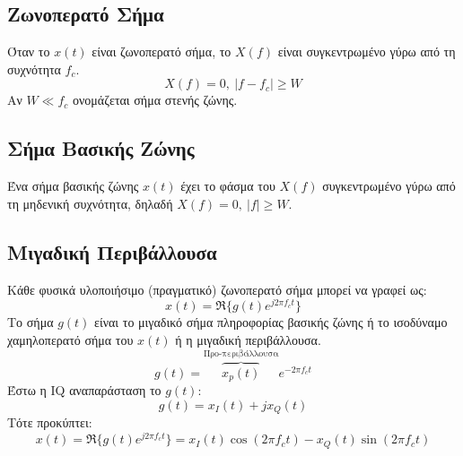 \documentclass[a4paper,12pt]{article}
\begin{document}
\subsection*{Ζωνοπερατό Σήμα}
Όταν το \(x(t)\) είναι ζωνοπερατό σήμα, το \(X(f)\) είναι συγκεντρωμένο γύρω από τη συχνότητα \(f_c\).
\[
X(f)=0, \ |f-f_c|\geq W
\]
Αν \(W \ll f_c\) ονομάζεται σήμα στενής ζώνης.




\subsection*{Σήμα Βασικής Ζώνης}
Ένα σήμα βασικής ζώνης \(x(t)\) έχει το φάσμα του \(X(f)\) συγκεντρωμένο γύρω από τη μηδενική συχνότητα, δηλαδή \(X(f)=0, \ |f|\geq W\).

\subsection*{Μιγαδική Περιβάλλουσα}
Κάθε φυσικά υλοποιήσιμο (πραγματικό) ζωνοπερατό σήμα μπορεί να γραφεί ως:
\[
x(t)=\Re\{g(t)e^{j2 \pi f_c t}\}
\]
Το σήμα \(g(t)\) είναι το μιγαδικό σήμα πληροφορίας βασικής ζώνης ή το ισοδύναμο χαμηλοπερατό σήμα του \(x(t)\) ή η μιγαδική περιβάλλουσα.
\[
g(t)=\overbrace{x_p(t)}^\text{Προ-περιβάλλουσα}e^{-2\pi f_c t}
\]
Έστω η IQ αναπαράσταση το \(g(t)\):
\[
g(t)=x_I(t)+jx_Q(t)
\]
Τότε προκύπτει:
\[
x(t)=\Re\{g(t)e^{j 2 \pi f_c t}\}=x_I(t)\cos(2\pi f_c t)-x_Q(t)\sin(2\pi f_c t)
\]
\end{document}
